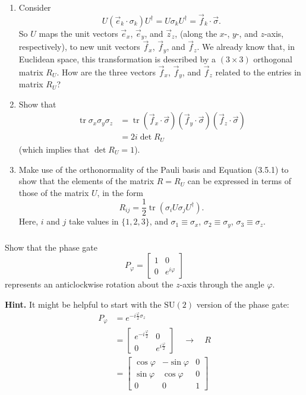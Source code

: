 \documentclass[fleqn]{article}
\begin{document}
\begin{enumerate}
\def\labelenumi{\arabic{enumi}.}
\item
  Consider
  \[
     U(\vec e_k\cdot\sigma_k)U^\dagger=U\sigma_kU^\dagger={\vec f_k}\cdot\vec\sigma.
   \]
  So \(U\) maps the unit vectors \(\vec e_x\), \(\vec e_y\), and \(\vec z_z\), (along the \(x\)-, \(y\)-, and \(z\)-axis, respectively), to new unit vectors \(\vec f_x\), \(\vec f_y\), and \(\vec f_z\).
  We already know that, in Euclidean space, this transformation is described by a \((3\times 3)\) orthogonal matrix \(R_U\).
  How are the three vectors \(\vec f_x\), \(\vec f_y\), and \(\vec f_z\) related to the entries in matrix \(R_U\)?
\item
  Show that
  \[
     \begin{aligned}
       \operatorname{tr}\sigma_x\sigma_y\sigma_z
       &= \operatorname{tr}({\vec f_x}\cdot\vec\sigma)( {\vec f_y}\cdot\vec\sigma)({\vec f_z}\cdot\vec\sigma)
     \\&= 2i\det R_U
     \end{aligned}
   \]
  (which implies that \(\det R_U=1\)).
\item
  Make use of the orthonormality of the Pauli basis and Equation (3.5.1) to show that the elements of the matrix \(R=R_U\) can be expressed in terms of those of the matrix \(U\), in the form
  \[
     R_{ij}=\frac12\operatorname{tr}\left(\sigma_i U\sigma_j U^\dagger\right).
   \]
  Here, \(i\) and \(j\) take values in \(\{1,2,3\}\), and \(\sigma_1\equiv\sigma_x\), \(\sigma_2\equiv\sigma_y\), \(\sigma_3\equiv\sigma_z\).
\end{enumerate}

\hypertarget{section-20}{%
\subsubsection{}\label{section-20}}

Show that the phase gate
\[
  P_\varphi = \begin{bmatrix}1&0\\0&e^{i\varphi}\end{bmatrix}
\]
represents an anticlockwise rotation about the \(z\)-axis through the angle \(\varphi\).

\textbf{Hint.} It might be helpful to start with the \(\mathrm{SU}(2)\) version of the phase gate:
\[
  \begin{aligned}
    P_\varphi
    &= e^{-i\frac{\varphi}{2}\sigma_z}
  \\&= \begin{bmatrix}
      e^{-i \frac{\varphi}{2}}& 0
    \\0 & e^{i \frac{\varphi}{2}}
    \end{bmatrix}
    \quad\longrightarrow\quad
    R
  \\&= \begin{bmatrix}
      \cos \varphi & -\sin \varphi & 0
    \\\sin \varphi & \cos \varphi & 0
    \\0 & 0 & 1
    \end{bmatrix}
  \end{aligned}
\]
\end{document}
